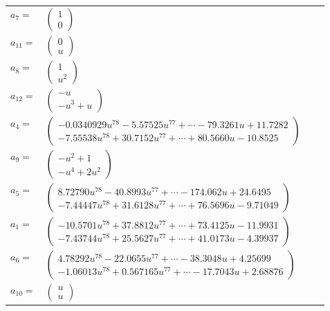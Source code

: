 \documentclass[1p]{elsarticle_modified}
\theoremstyle{definition}
\begin{document}
\begin{tabular}{m{7pt} m{180pt} m{7pt} m{180pt} }
\flushright $a_{7}=$&$\begin{pmatrix}1\\0\end{pmatrix}$ \\
\flushright $a_{11}=$&$\begin{pmatrix}0\\u\end{pmatrix}$ \\
\flushright $a_{8}=$&$\begin{pmatrix}1\\u^2\end{pmatrix}$ \\
\flushright $a_{12}=$&$\begin{pmatrix}- u\\- u^3+u\end{pmatrix}$ \\
\flushright $a_{4}=$&$\begin{pmatrix}-0.0340929 u^{78}-5.57525 u^{77}+\cdots-79.3261 u+11.7282\\-7.55538 u^{78}+30.7152 u^{77}+\cdots+80.5660 u-10.8525\end{pmatrix}$ \\
\flushright $a_{9}=$&$\begin{pmatrix}- u^2+1\\- u^4+2 u^2\end{pmatrix}$ \\
\flushright $a_{5}=$&$\begin{pmatrix}8.72790 u^{78}-40.8993 u^{77}+\cdots-174.062 u+24.6495\\-7.44447 u^{78}+31.6128 u^{77}+\cdots+76.5696 u-9.71049\end{pmatrix}$ \\
\flushright $a_{1}=$&$\begin{pmatrix}-10.5701 u^{78}+37.8812 u^{77}+\cdots+73.4125 u-11.9931\\-7.43744 u^{78}+25.5627 u^{77}+\cdots+41.0173 u-4.39937\end{pmatrix}$ \\
\flushright $a_{6}=$&$\begin{pmatrix}4.78292 u^{78}-22.0655 u^{77}+\cdots-38.3048 u+4.25699\\-1.06013 u^{78}+0.567165 u^{77}+\cdots-17.7043 u+2.68876\end{pmatrix}$ \\
\flushright $a_{10}=$&$\begin{pmatrix}u\\u\end{pmatrix}$ \\

\end{tabular}
\end{document}
